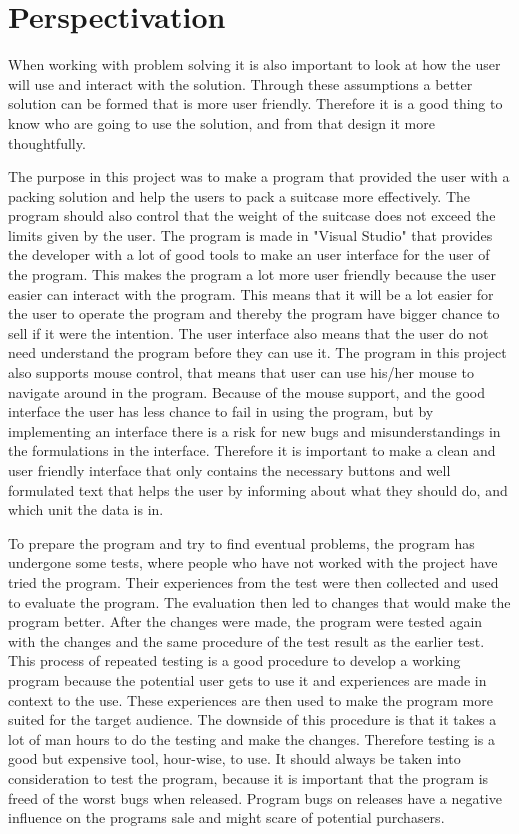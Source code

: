 \section{Perspectivation}
When working with problem solving it is also important to look at how the user will use and interact with the solution. Through these assumptions a better solution can be formed that is more user friendly. Therefore it is a good thing to know who are going to use the solution, and from that design it more thoughtfully.

The purpose in this project was to make a program that provided the user with a packing solution and help the users to pack a suitcase more effectively. The program should also control that the weight of the suitcase does not exceed the limits given by the user. The program is made in "Visual Studio" that provides the developer with a lot of good tools to make an user interface for the user of the program.
This makes the program a lot more user friendly because the user easier can interact with the program. This means that it will be a lot easier for the user to operate the program and thereby the program have bigger chance to sell if it were the intention.
The user interface also means that the user do not need understand the program before they can use it.
The program in this project also supports mouse control, that means that user can use his/her mouse to navigate around in the program. Because of the mouse support, and the good interface the user has less chance to fail in using the program, but by implementing an interface there is a risk for new bugs and misunderstandings in the formulations in the interface.
Therefore it is important to make a clean and user friendly interface that only contains the necessary buttons and well formulated text that helps the user by informing about what they should do, and which unit the data is in.

To prepare the program and try to find eventual problems, the program has undergone some tests, where people who have not worked with the project have tried the program. Their experiences from the test were then collected and used to evaluate the program. The evaluation then led to changes that would make the program better. After the changes were made, the program were tested again with the changes and the same procedure of the test result as the earlier test.
This process of repeated testing is a good procedure to develop a working program because the potential user gets to use it and experiences are made in context to the use. These experiences are then used to make the program more suited for the target audience. The downside of this procedure is that it takes a lot of man hours to do the testing and make the changes. Therefore testing is a good but expensive tool, hour-wise, to use.
It should always be taken into consideration to test the program, because it is important that the program is freed of the worst bugs when released. Program bugs on releases have a negative influence on the programs sale and might scare of potential purchasers.


